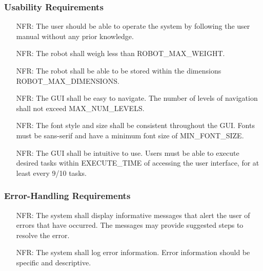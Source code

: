\documentclass[12pt]{article}
\newcounter{nfrnum} %
\begin{document}
\subsubsection{Usability Requirements}

\noindent \begin{itemize}
\item[NFR\refstepcounter{nfrnum}\thenfrnum \label{NFR_Usability1}:] The user should be able to operate the system by following the user manual without any prior knowledge.
\item[NFR\refstepcounter{nfrnum}\thenfrnum \label{NFR_Usability2}:] The robot shall weigh less than ROBOT\_MAX\_WEIGHT.
\item[NFR\refstepcounter{nfrnum}\thenfrnum \label{NFR_Usability3}:] The robot shall be able to be stored within the dimensions ROBOT\_MAX\_DIMENSIONS.
\item[NFR\refstepcounter{nfrnum}\thenfrnum \label{NFR_Usability4}:] The GUI shall be easy to navigate. The number of levels of navigation shall not exceed MAX\_NUM\_LEVELS.
\item[NFR\refstepcounter{nfrnum}\thenfrnum \label{NFR_Usability5}:] The font style and size shall be consistent throughout the GUI. Fonts must be sans-serif and have a minimum font size of MIN\_FONT\_SIZE.
\item[NFR\refstepcounter{nfrnum}\thenfrnum \label{NFR_Usability6}:] The GUI shall be intuitive to use. Users must be able to execute desired tasks within EXECUTE\_TIME of accessing the user interface, for at least every 9/10 tasks.
\end{itemize}

\subsubsection{Error-Handling Requirements}
\noindent \begin{itemize}
\item[NFR\refstepcounter{nfrnum}\thenfrnum \label{NFR_Errors1}:] The system shall display informative messages that alert the user of errors that have occurred. The messages may provide suggested steps to resolve the error.
\item[NFR\refstepcounter{nfrnum}\thenfrnum \label{NFR_Errors2}:] The system shall log error information. Error information should be specific and descriptive.
\end{itemize}
\end{document}
